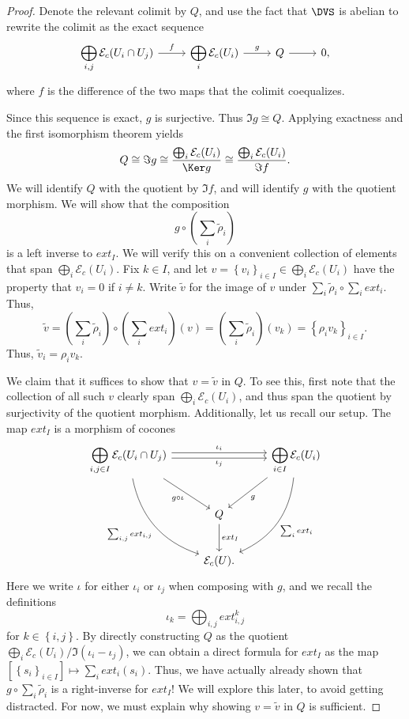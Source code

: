 \begin{proof}
	Denote the relevant colimit by $Q$, and use the fact that $\DVS $ is abelian to rewrite the colimit as the exact sequence
	\[\begin{tikzcd}[row sep = 2.5em, column sep = 2.5em]
		\displaystyle{\bigoplus_{i,j} \mathcal{E} _c(U_i \cap U_j)}\ar[" f ", r]  & \displaystyle{\bigoplus_{i} \mathcal{E} _c(U_i)}\ar[" g ", r]  & Q\ar[r]  & 0,
	\end{tikzcd}\]
	where $f$ is the difference of the two maps that the colimit coequalizes.

	Since this sequence is exact, $g$ is surjective. Thus $\Im g \cong Q$. Applying exactness and the first isomorphism theorem yields
	\[
		Q \cong \Im g \cong \frac{\bigoplus_{i} \mathcal{E} _c(U_i)}{\Ker g} \cong \frac{\bigoplus_{i} \mathcal{E} _c(U_i)}{\Im f} 
	.\]
	We will identify $Q$ with the quotient by $\Im f$, and will identify $g$ with the quotient morphism. We will show that the composition
	\[
		g \circ \left( \sum_{i} \widetilde{\rho } _i \right) 
	\]
	is a left inverse to $ext_I$. We will verify this on a convenient collection of elements that span $\bigoplus_{i} \mathcal{E} _c(U_i)$. Fix $k\in I$, and let $v = \left\{ v_i \right\}_{i\in I} \in \bigoplus_{i} \mathcal{E} _c(U_i)$ have the property that $v_i = 0$ if $i\neq k$. Write $\widetilde{v} $ for the image of $v$ under $\sum_{i} \widetilde{\rho } _i \circ \sum_{i} ext_i$. Thus,
	\[
		\widetilde{v} = \left( \sum_{i} \widetilde{\rho } _i \right) \circ \left( \sum_{i} ext_i \right) (v) = \left( \sum_{i} \widetilde{\rho } _i \right) (v_k) = \left\{ \rho _iv_k \right\}_{i\in I} 
	.\]
	Thus, $\widetilde{v}_i = \rho _iv_k$.

	We claim that it suffices to show that $v= \widetilde{v} $ in $Q$. To see this, first note that the collection of all such $v$ clearly span $\bigoplus_{i} \mathcal{E} _c(U_i)$, and thus span the quotient by surjectivity of the quotient morphism. Additionally, let us recall our setup. The map $ext_I$ is a morphism of cocones
	\[\begin{tikzcd}[row sep = 2.5em, column sep = 2.5em]
		\displaystyle{\bigoplus_{i,j\in I} \mathcal{E} _c(U_i \cap U_j)} \ar[" \iota_i ", shift left, rr] \ar[" \iota _j "', shift right, rr] \ar[" g\circ \iota  "', dr] \ar[" \sum_{i,j} ext_{i,j} "', bend right, ddr]  &  & \displaystyle{\bigoplus_{i\in I} \mathcal{E} _c(U_i)}\ar[" g ", dl] \ar[" \sum_{i} ext_i ", bend left, ddl]  \\
	 & Q \ar[" ext_I ", d]  &  \\
	 & \mathcal{E} _c(U). & 
	\end{tikzcd}\]
	Here we write $\iota $ for either $\iota _i$ or $\iota _j$ when composing with $g$, and we recall the definitions
	\[
		\iota _k = \bigoplus_{i,j} ext_{i,j}^k
	\]
	for $k\in\left\{ i,j \right\} $. By directly constructing $Q$ as the quotient $\bigoplus_{i} \mathcal{E} _c(U_i) / \Im (\iota _i - \iota _j)$, we can obtain a direct formula for $ext_I$ as the map $[\left\{ s_i \right\}_{i\in I} ]\mapsto \sum_{i} ext_i(s_i)$. Thus, we have actually already shown that $g\circ \sum_{i} \widetilde{\rho } _i$ is a right-inverse for $ext_I$! We will explore this later, to avoid getting distracted. For now, we must explain why showing $v= \widetilde{v} $ in $Q$ is sufficient.


\end{proof}
